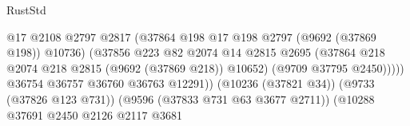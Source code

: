 \begin{lexlean}{RustStd}
\begin{coremodule}
{\begin{coremodule}
{{{{{{{{{{{{{{{{{{{{{{{{{{{{{{{{{{{{{{{{{{{{{{{{{{{{{{{                                                          @17
                                                          @2108
                                                          @2797
                                                          @2817
                                                          (@37864
                                                            @198
                                                            @17
                                                            @198
                                                            @2797
                                                            (@9692 (@37869 @198))
                                                            @10736)
                                                          (@37856
                                                            @223
                                                            @82
                                                            @2074
                                                            @14
                                                            @2815
                                                            @2695
                                                            (@37864
                                                              @218
                                                              @2074
                                                              @218
                                                              @2815
                                                              (@9692 (@37869 @218))
                                                              @10652)
                                                            (@9709 @37795 @2450)))))
                                                    @36754
                                                    @36757
                                                    @36760
                                                    @36763
                                                    @12291))
                                                (@10236 (@37821 @34))
                                                (@9733 (@37826 @123 @731))
                                                (@9596 (@37833 @731 @63 @3677 @2711))
                                                (@10288
                                                  @37691
                                                  @2450
                                                  @2126
                                                  @2117
                                                  @3681
}}}}}}}}}}}}}}}}}}}}}}}}}}}}}}}}}}}}}}}}}}}}}}}}}}}}}}}
\end{coremodule}}
\end{coremodule}
\end{lexlean}
